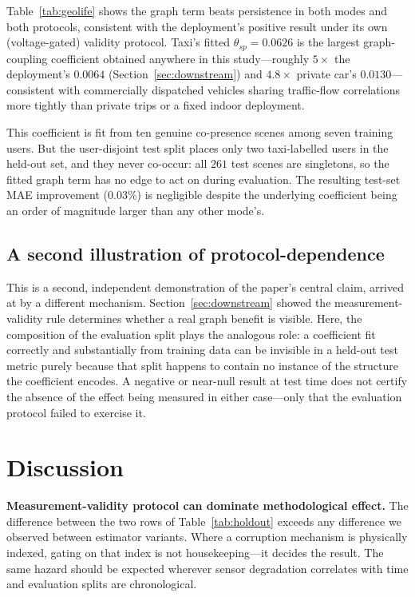 \documentclass[conference]{IEEEtran}
\begin{document}
Table~\ref{tab:geolife} shows the graph term beats persistence in both modes
and both protocols, consistent with the deployment's positive result under
its own (voltage-gated) validity protocol. Taxi's fitted
$\theta_{sp} = 0.0626$ is the largest graph-coupling coefficient obtained
anywhere in this study---roughly $5\times$ the deployment's $0.0064$
(Section~\ref{sec:downstream}) and $4.8\times$ private car's $0.0130$---
consistent with commercially dispatched vehicles sharing traffic-flow
correlations more tightly than private trips or a fixed indoor deployment.

This coefficient is fit from ten genuine co-presence scenes among seven
training users. But the user-disjoint test split places only two
taxi-labelled users in the held-out set, and they never co-occur: all $261$
test scenes are singletons, so the fitted graph term has no edge to act on
during evaluation. The resulting test-set MAE improvement ($0.03\%$) is
negligible despite the underlying coefficient being an order of magnitude
larger than any other mode's.

\subsection{A second illustration of protocol-dependence}

This is a second, independent demonstration of the paper's central claim,
arrived at by a different mechanism. Section~\ref{sec:downstream} showed the
measurement-validity rule determines whether a real graph benefit is visible.
Here, the composition of the evaluation split plays the analogous role: a
coefficient fit correctly and substantially from training data can be
invisible in a held-out test metric purely because that split happens to
contain no instance of the structure the coefficient encodes. A negative or
near-null result at test time does not certify the absence of the effect
being measured in either case---only that the evaluation protocol failed to
exercise it.

\section{Discussion}

\textbf{Measurement-validity protocol can dominate methodological effect.} The
difference between the two rows of Table~\ref{tab:holdout} exceeds any
difference we observed between estimator variants. Where a corruption mechanism
is physically indexed, gating on that index is not housekeeping---it decides
the result. The same hazard should be expected wherever sensor degradation
correlates with time and evaluation splits are chronological.
\end{document}
